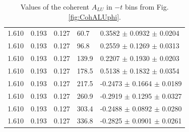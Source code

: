 \documentclass{article}
\begin{document}
\begin{table}[!h]
\begin{center}
\begin{tabular}{||l|l|l|l|l||}
  1.610 & 0.193 & 0.127 & 60.7  &  0.3582 $\pm$ 0.0932 $\pm$ 0.0204 \\
  1.610 & 0.193 & 0.127 & 96.8  &  0.2559 $\pm$ 0.1269 $\pm$ 0.0313 \\
  1.610 & 0.193 & 0.127 & 139.9 &  0.2207 $\pm$ 0.1930 $\pm$ 0.0203 \\
  1.610 & 0.193 & 0.127 & 178.5 &  0.5138 $\pm$ 0.1832 $\pm$ 0.0354 \\
  1.610 & 0.193 & 0.127 & 217.5 & -0.2473 $\pm$ 0.1664 $\pm$ 0.0189 \\
  1.610 & 0.193 & 0.127 & 260.9 & -0.2919 $\pm$ 0.1295 $\pm$ 0.0327 \\
  1.610 & 0.193 & 0.127 & 303.4 & -0.2488 $\pm$ 0.0892 $\pm$ 0.0280 \\
  1.610 & 0.193 & 0.127 & 336.8 & -0.2825 $\pm$ 0.0901 $\pm$ 0.0261 \\
         \hline
         \hline
      \end{tabular}
      \caption{Values of the coherent $A_{LU}$ in $-t$ bins from Fig. \ref{fig:CohALUphi}.}
      \label{table:Coh_t_BSA}
   \end{center}
\end{table}

\end{document}
